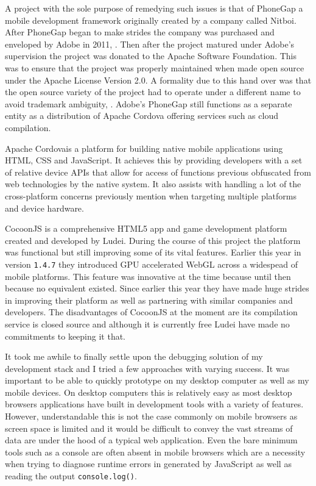 \documentclass[final]{cmpreport}
\begin{document}
A project with the sole purpose of remedying such issues is that of PhoneGap a mobile development framework originally created by a company called Nitboi. After PhoneGap began to make strides the company was purchased and enveloped by Adobe in 2011, \cite{Adobe}. Then after the project matured under Adobe's supervision the project was donated to the Apache Software Foundation. This was to ensure that the project was properly maintained when made open source under the Apache License Version 2.0\footnotemark. A formality due to this hand over was that the open source variety of the project had to operate under a different name to avoid trademark ambiguity, \cite{Leroux}. Adobe's PhoneGap still functions as a separate entity as a distribution of Apache Cordova offering services such as cloud compilation\footnotemark.


Apache Cordova\footnotemark is a platform for building native mobile applications using HTML, CSS and JavaScript. It achieves this by providing developers with a set of relative device APIs that allow for access of functions previous obfuscated from web technologies by the native system. It also assists with handling a lot of the cross-platform concerns previously mention when targeting multiple platforms and device hardware.


CocoonJS is a comprehensive HTML5 app and game development platform created and developed by Ludei. During the course of this project the platform was functional but still improving some of its vital features. Earlier this year in version \texttt{1.4.7} they introduced \footnotemark GPU accelerated WebGL across a widespead of mobile platforms. This feature was innovative at the time because until then because no equivalent existed. Since earlier this year they have made huge strides in improving their platform as well as partnering with similar companies and developers. The disadvantages of CocoonJS at the moment are its compilation service is closed source and although it is currently free Ludei have made no commitments to keeping it that.


It took me awhile to finally settle upon the debugging solution of my development stack and I tried a few approaches with varying success. It was important to be able to quickly prototype on my desktop computer as well as my mobile devices. On desktop computers this is relatively easy as most desktop browsers applications have built in development tools with a variety of features. However, understandable this is not the case commonly on mobile browsers as screen space is limited and it would be difficult to convey the vast streams of data are under the hood of a typical web application. Even the bare minimum tools such as a console are often absent in mobile browsers which are a necessity when trying to diagnose runtime errors in generated by JavaScript as well as reading the output \texttt{console.log()}.
\end{document}
